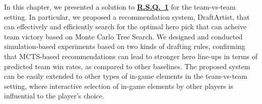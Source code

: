 In this chapter, we presented a solution to \hyperref[rq1]{\textbf{R.S.Q.~1}} for the team-vs-team setting. In particular, we proposed a recommendation system, DraftArtist, that can effectively and efficiently search for the optimal hero pick that can acheive team victory based on Monte Carlo Tree Search. We designed and conducted simulation-based experiments based on two kinds of drafting rules, confirming that MCTS-based recommendations can lead to stronger hero line-ups in terms of predicted team win rates, as compared to other baselines. The proposed system can be easily extended to other types of in-game elements in the team-vs-team setting, where interactive selection of in-game elements by other players is influential to the player's choice. 



